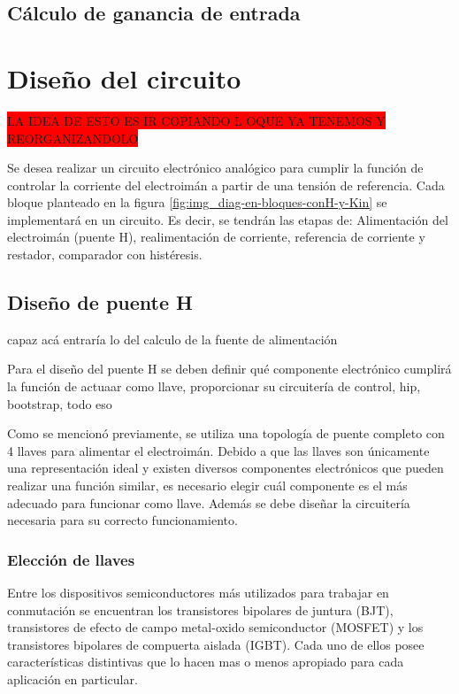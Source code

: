 \subsection{Cálculo de ganancia de entrada}






\section{Diseño del circuito}

\colorbox{red}{LA IDEA DE ESTO ES IR COPIANDO L OQUE YA TENEMOS Y REORGANIZANDOLO}

Se desea realizar un circuito electrónico analógico para cumplir la función de controlar la corriente del electroimán a partir de una tensión de referencia. Cada bloque planteado en la figura \ref{fig:img_diag-en-bloques-conH-y-Kin} se implementará en un circuito. Es decir, se tendrán las etapas de: Alimentación del electroimán (puente H), realimentación de corriente, referencia de corriente y restador, comparador con histéresis.

\subsection{Diseño de puente H}

capaz acá entraría lo del calculo de la fuente de alimentación

Para el diseño del puente H se deben definir qué componente electrónico cumplirá la función de actuaar como llave, proporcionar su circuitería de control, hip, bootstrap, todo eso


Como se mencionó previamente, se utiliza una topología de puente completo con 4 llaves para alimentar el electroimán. Debido a que las llaves son únicamente una representación ideal y existen diversos componentes electrónicos que pueden realizar una función similar, es necesario elegir cuál componente es el más adecuado para funcionar como llave. Además se debe diseñar la circuitería necesaria para su correcto funcionamiento.

\subsubsection{Elección de llaves}

Entre los dispositivos semiconductores más utilizados para trabajar en conmutación se encuentran los transistores bipolares de juntura (BJT), transistores de efecto de campo metal-oxido semiconductor (MOSFET) y los transistores bipolares de compuerta aislada (IGBT). Cada uno de ellos posee características distintivas que lo hacen mas o menos apropiado para cada aplicación en particular.

